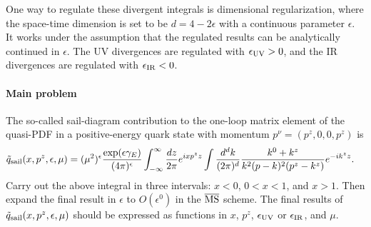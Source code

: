 One way to regulate these divergent integrals is dimensional regularization, where the space-time dimension is set to be $d=4-2\epsilon$ with a continuous parameter $\epsilon$. It works under the assumption that the regulated results can be analytically continued in $\epsilon$. The UV divergences are regulated with $\epsilon_{\rm UV}>0$, and the IR divergences are regulated with $\epsilon_{\rm IR}<0$.

\paragraph*{Main problem}

The so-called sail-diagram contribution to the one-loop matrix element of the quasi-PDF in a positive-energy quark state with momentum $p^\nu=(p^z,0,0,p^z)$ is
\begin{align}
    \tilde q_{\rm sail}(x,p^z,\epsilon,\mu) &=(\mu^2)^\epsilon \frac{\exp(\epsilon\gamma_E)}{(4\pi)^\epsilon}\int_{-\infty}^\infty \frac{dz }{2\pi}e^{ixp^z z} \int \frac{d^d k}{(2\pi)^d} \frac{k^0+k^z}{k^2 (p-k)^2 (p^z-k^z)}e^{-ik^z z}.
\end{align}
Carry out the above integral in three intervals: $x < 0$, $0<x<1$, and $x>1$. Then expand the final result in $\epsilon$ to $O(\epsilon^0)$ in the $\overline{\rm MS}$ scheme. The final results of $\tilde q_{\rm sail}(x,p^z,\epsilon,\mu)$ should be expressed as functions in $x$, $p^z$, $\epsilon_{\rm UV}$ or $\epsilon_{\rm IR}$, and $\mu$.
